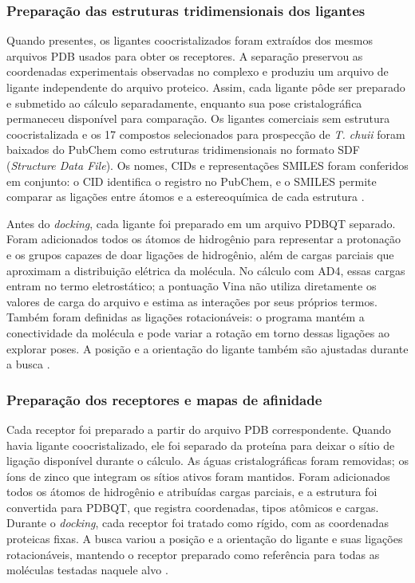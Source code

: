 \subsubsection{Preparação das estruturas tridimensionais dos ligantes}
Quando presentes, os ligantes coocristalizados foram extraídos dos mesmos arquivos PDB usados para obter os receptores. A separação preservou as coordenadas experimentais observadas no complexo e produziu um arquivo de ligante independente do arquivo proteico. Assim, cada ligante pôde ser preparado e submetido ao cálculo separadamente, enquanto sua pose cristalográfica permaneceu disponível para comparação. Os ligantes comerciais sem estrutura coocristalizada e os 17 compostos selecionados para prospecção de \textit{T. chuii} foram baixados do PubChem como estruturas tridimensionais no formato SDF (\textit{Structure Data File}). Os nomes, CIDs e representações SMILES foram conferidos em conjunto: o CID identifica o registro no PubChem, e o SMILES permite comparar as ligações entre átomos e a estereoquímica de cada estrutura \parencite{pubchem2023}.

Antes do \textit{docking}, cada ligante foi preparado em um arquivo PDBQT separado. Foram adicionados todos os átomos de hidrogênio para representar a protonação e os grupos capazes de doar ligações de hidrogênio, além de cargas parciais que aproximam a distribuição elétrica da molécula. No cálculo com AD4, essas cargas entram no termo eletrostático; a pontuação Vina não utiliza diretamente os valores de carga do arquivo e estima as interações por seus próprios termos. Também foram definidas as ligações rotacionáveis: o programa mantém a conectividade da molécula e pode variar a rotação em torno dessas ligações ao explorar poses. A posição e a orientação do ligante também são ajustadas durante a busca \parencite{morris2009autodock,trott2010,eberhardt2021vina}.

\subsubsection{Preparação dos receptores e mapas de afinidade}
Cada receptor foi preparado a partir do arquivo PDB correspondente. Quando havia ligante coocristalizado, ele foi separado da proteína para deixar o sítio de ligação disponível durante o cálculo. As águas cristalográficas foram removidas; os íons de zinco que integram os sítios ativos foram mantidos. Foram adicionados todos os átomos de hidrogênio e atribuídas cargas parciais, e a estrutura foi convertida para PDBQT, que registra coordenadas, tipos atômicos e cargas. Durante o \textit{docking}, cada receptor foi tratado como rígido, com as coordenadas proteicas fixas. A busca variou a posição e a orientação do ligante e suas ligações rotacionáveis, mantendo o receptor preparado como referência para todas as moléculas testadas naquele alvo \parencite{morris2009autodock,eberhardt2021vina}.


